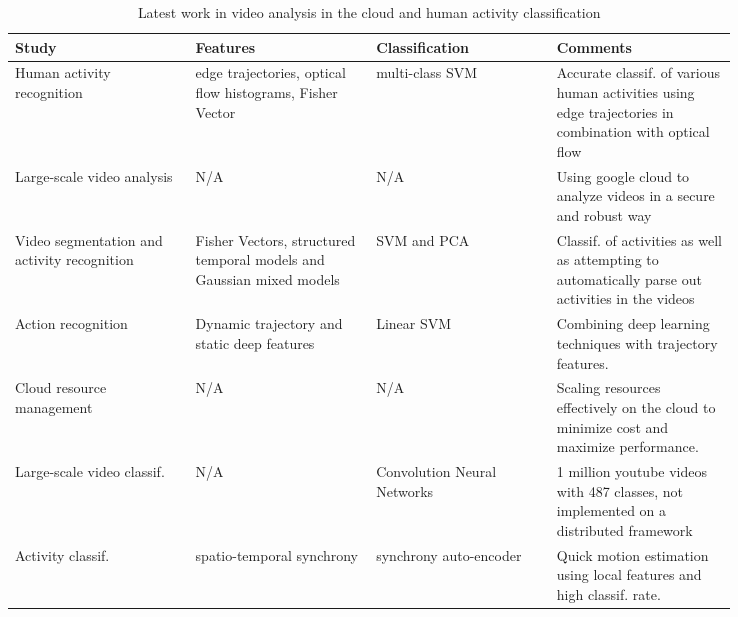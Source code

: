 \begin{singlespace}
  \begin{table}[h]
  \begin{centering}
    \begin{tabular}{ | p{0.21\linewidth} | p{0.21\linewidth} | p{0.21\linewidth} | p{0.21\linewidth}| }
    \hline
    \textbf{Study} & \textbf{Features} & \textbf{Classification} & \textbf{Comments} \\
    \hline
    Human activity recognition \cite{wang2016action}&
    edge trajectories, optical flow histograms, Fisher Vector & multi-class SVM
    & Accurate classif. of various
    human activities using edge trajectories in combination with optical flow \\
    \hline
    Large-scale video analysis \cite{wang2016cloud} & N/A & N/A & Using google cloud to analyze videos in a secure and robust way \\
    \hline
    Video segmentation and activity recognition \cite{kuehne2016end} & Fisher Vectors, structured
    temporal models and Gaussian mixed models & SVM and PCA & Classif. of activities as
    well as attempting to automatically parse out activities in the videos \\
    \hline
    Action recognition \cite{cai2016towards} & Dynamic trajectory and static deep features
    & Linear SVM & Combining deep learning techniques with trajectory features. \\
    \hline
    Cloud resource management \cite{kaseb2015cloud} & N/A & N/A & Scaling resources effectively
    on the cloud to minimize cost and maximize performance.\\
    \hline
    Large-scale video classif. \cite{karpathy2014large} & N/A &
    Convolution Neural Networks & 1 million youtube videos with 487 classes,
    not implemented on a distributed framework \\
    \hline
    Activity classif. \cite{niebles2010modeling} & spatio-temporal synchrony
    & synchrony auto-encoder & Quick motion estimation using local features
    and high classif. rate. \\
    \hline
    \end{tabular}
    \caption{Latest work in video analysis in the cloud and human activity classification}
    \label{tab:paper_summary}
  \end{centering}
\end{table}
\end{singlespace}

\FloatBarrier

